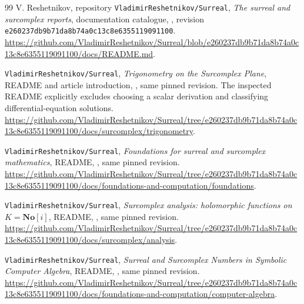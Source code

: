 \documentclass[11pt,letterpaper]{article}
\numberwithin{equation}{section}
\theoremstyle{definition}
\theoremstyle{remark}
\newcommand{\No}{\mathbf{No}}
\newcommand{\repo}{\texttt{VladimirReshetnikov/Surreal}}
\newcommand{\revision}{\texttt{e260237db9b71da8b74a0c13c8e6355119091100}}
\begin{document}
\begin{thebibliography}{99}
V. Reshetnikov, repository \repo,
\emph{The surreal and surcomplex reports}, documentation catalogue,
, revision \revision.
\url{https://github.com/VladimirReshetnikov/Surreal/blob/e260237db9b71da8b74a0c13c8e6355119091100/docs/README.md}.

\repo,
\emph{Trigonometry on the Surcomplex Plane}, README and article introduction,
, same pinned revision.
The inspected README explicitly excludes choosing a scalar derivation and classifying differential-equation solutions.
\url{https://github.com/VladimirReshetnikov/Surreal/tree/e260237db9b71da8b74a0c13c8e6355119091100/docs/surcomplex/trigonometry}.

\repo,
\emph{Foundations for surreal and surcomplex mathematics}, README,
, same pinned revision.
\url{https://github.com/VladimirReshetnikov/Surreal/tree/e260237db9b71da8b74a0c13c8e6355119091100/docs/foundations-and-computation/foundations}.

\repo,
\emph{Surcomplex analysis: holomorphic functions on $K=\No[i]$}, README,
, same pinned revision.
\url{https://github.com/VladimirReshetnikov/Surreal/tree/e260237db9b71da8b74a0c13c8e6355119091100/docs/surcomplex/analysis}.

\repo,
\emph{Surreal and Surcomplex Numbers in Symbolic Computer Algebra}, README,
, same pinned revision.
\url{https://github.com/VladimirReshetnikov/Surreal/tree/e260237db9b71da8b74a0c13c8e6355119091100/docs/foundations-and-computation/computer-algebra}.
\end{thebibliography}
\end{document}
